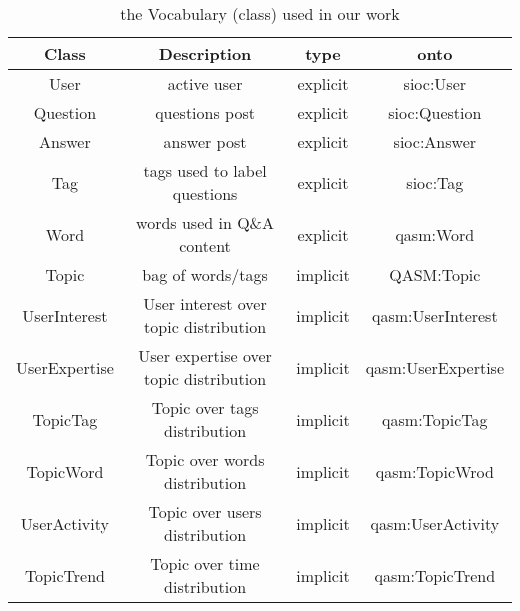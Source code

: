 \begin{sidewaystable}
    \centering
    \begin{tabular}{c|c|c|c}
    \hline
    Class &  Description & type & onto \\ \hline
    User  & active user & explicit &  sioc:User \\ \hline
    Question & questions post & explicit & sioc:Question \\ \hline
    Answer  & answer post & explicit & sioc:Answer \\ \hline
    Tag & tags used to label questions & explicit & sioc:Tag \\ \hline
    Word & words used in Q\&A content & explicit & qasm:Word \\ \hline
    Topic & bag of words/tags & implicit & QASM:Topic \\ \hline     
    UserInterest& User interest over topic distribution & implicit& qasm:UserInterest\\ \hline
    UserExpertise & User expertise over topic distribution &implicit& qasm:UserExpertise \\ \hline
    TopicTag &Topic over tags distribution&implicit &qasm:TopicTag \\ \hline
    
    TopicWord&Topic over words distribution &implicit & qasm:TopicWrod\\ \hline
    
    UserActivity&Topic over users distribution & implicit &qasm:UserActivity \\ \hline
    
    TopicTrend &Topic over time distribution &implicit & qasm:TopicTrend\\ \hline
          
    \end{tabular}
    \caption{the Vocabulary (class) used in our work}
    \label{tab:qaontoclass}
\end{sidewaystable}


